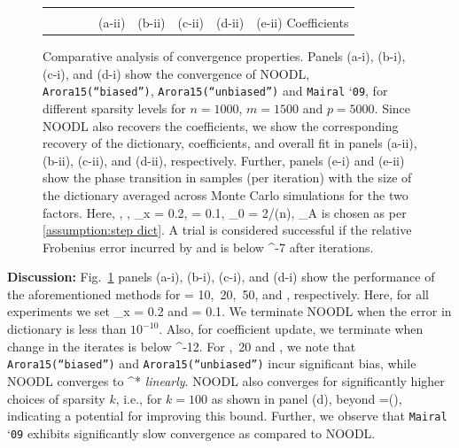\documentclass{article}
\def\[#1\]{{$#1$}}
\def\b#1{{\mathbf{#1}}}
\def\c#1{{\mathcal{#1}}}
\begin{document}
{\begin{figure}[!t]
\begin{tabular}{ccccc}
\vspace{0.05in}

\\

~~~~~~~~{\footnotesize (a-ii)} 
&{\footnotesize  (b-ii)} 
&{\footnotesize  (c-ii)} 
&{\footnotesize (d-ii) }
&{\footnotesize (e-ii) {\scriptsize Coefficients}}
\vspace{-7pt}\\
\end{tabular}
\caption{Comparative analysis of convergence properties. Panels (a-i), (b-i), (c-i), and (d-i) show the convergence of NOODL,  \texttt{Arora15(``biased'')}, \texttt{Arora15(``unbiased'')} and {\texttt{Mairal} `\texttt{09}}, for different sparsity levels for $n=1000$, $m=1500$ and $p =5000$. Since NOODL also recovers the coefficients, we show the corresponding recovery of the dictionary, coefficients, and overall fit in panels (a-ii), (b-ii), (c-ii), and (d-ii), respectively. Further, panels (e-i)  and (e-ii) show the phase transition in samples \[p\] (per iteration) with the size of the dictionary \[m\] averaged across \[10\] Monte Carlo simulations for the two factors.  Here, \[n=100\], \[k =3\], \[\eta_x = 0.2\], \[\tau = 0.1\], \[\epsilon_0 =  2/\log(n)\], \[\eta_A\] is chosen as per \ref{assumption:step dict}. A trial is considered successful if the relative Frobenius error incurred by \[\hat{\b{A}}\] and \[\hat{\b{X}}\] is below \[5^{-7}\] after \[50\] iterations.}
\label{fig:recovery}
\vspace{-7pt}
\end{figure}}





\noindent\textbf{Discussion:} Fig.~\ref{fig:recovery} panels (a-i), (b-i), (c-i), and (d-i) show the performance of the aforementioned methods for \[k = 10,~20,~50\],
and \[100\], respectively. Here, for all experiments we set \[\eta_x = 0.2\] and \[\tau = 0.1\]. We terminate NOODL when the error in dictionary is less than $10^{-10}$. Also, for coefficient update, we terminate when change in the iterates is below \[10^{-12}\]. 
For \[k=10,~20\] and \[k=50\], we note that \texttt{Arora15(``biased'')} and \texttt{Arora15(``unbiased'')} incur significant bias, while NOODL converges to \[\b{A}^*\] \textit{linearly}. NOODL also converges for significantly higher choices of sparsity $k$, i.e., for $k=100$ as shown in panel (d), beyond \[k=\c{O}()\], indicating a potential for improving this bound. Further, we observe that {\texttt{Mairal} `\texttt{09}} exhibits significantly slow convergence as compared to NOODL.
\end{document}
